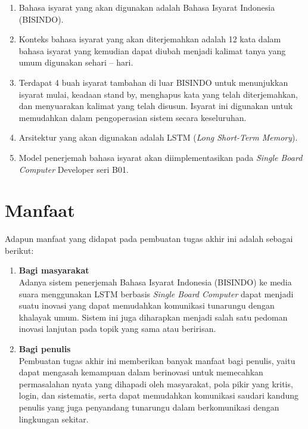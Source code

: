\begin{enumerate}[nolistsep]

  \item Bahasa isyarat yang akan digunakan adalah Bahasa Isyarat Indonesia (BISINDO).

  \item Konteks bahasa isyarat yang akan diterjemahkan adalah 12 kata dalam bahasa isyarat yang kemudian dapat diubah menjadi kalimat tanya yang umum digunakan sehari – hari.

  \item Terdapat 4 buah isyarat tambahan di luar BISINDO untuk menunjukkan isyarat mulai, keadaan stand by, menghapus kata yang telah diterjemahkan, dan menyuarakan kalimat yang telah disusun. Isyarat ini digunakan untuk memudahkan dalam pengoperasian sistem secara keseluruhan.

  \item Arsitektur yang akan digunakan adalah LSTM (\emph{Long Short-Term Memory}).
  
  \item Model penerjemah bahasa isyarat akan diimplementasikan pada \emph{Single Board Computer} Developer seri B01.
\end{enumerate}

\section{Manfaat}
\label{sec:manfaatpenulisan}

Adapun manfaat yang didapat pada pembuatan tugas akhir ini adalah sebagai berikut:

\begin{enumerate}[nolistsep]

  \item \textbf{Bagi masyarakat} \\     
  Adanya sistem penerjemah Bahasa Isyarat Indonesia (BISINDO) ke media suara menggunakan LSTM berbasis \emph{Single Board Computer} dapat menjadi suatu inovasi yang dapat memudahkan komunikasi tunarungu dengan khalayak umum. Sistem ini juga diharapkan menjadi salah satu pedoman inovasi lanjutan pada topik yang sama atau beririsan.
        \vspace{2ex}

  \item \textbf{Bagi penulis} \\
  Pembuatan tugas akhir ini memberikan banyak manfaat bagi penulis, yaitu dapat mengasah kemampuan dalam berinovasi untuk memecahkan permasalahan nyata yang dihapadi oleh masyarakat, pola pikir yang kritis, login, dan sistematis, serta dapat memudahkan komunikasi saudari kandung penulis yang juga penyandang tunarungu dalam berkomunikasi dengan lingkungan sekitar.

\end{enumerate}

